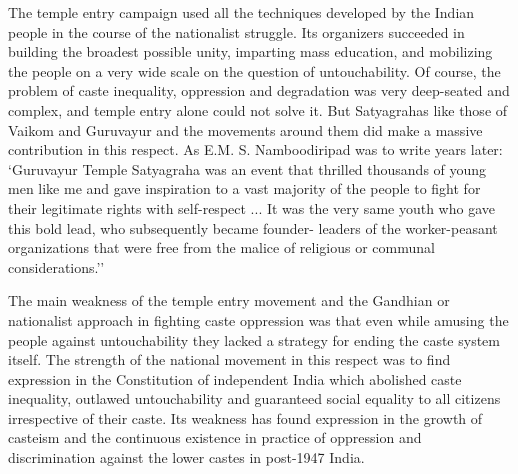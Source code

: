 The temple entry campaign used all the techniques developed by the Indian people in the course of the nationalist struggle. Its organizers succeeded in building the broadest possible unity, imparting mass education, and mobilizing the people on a very wide scale on the question of untouchability. Of course, the problem of caste inequality, oppression and degradation was very deep-seated and complex, and temple entry alone could not solve it. But Satyagrahas like those of Vaikom and Guruvayur and the movements around them did make a massive contribution in this respect. As E.M. S. Namboodiripad was to write years later: `Guruvayur Temple Satyagraha was an event that thrilled thousands of young men like me and gave inspiration to a vast majority of the people to fight for their legitimate rights with self-respect ... It was the very same youth who gave this bold lead, who subsequently became founder- leaders of the worker-peasant organizations that were free from the malice of religious or communal considerations.''

The main weakness of the temple entry movement and the Gandhian or nationalist approach in fighting caste oppression was that even while amusing the people against untouchability they lacked a strategy for ending the caste system itself. The strength of the national movement in this respect was to find expression in the Constitution of independent India which abolished caste inequality, outlawed untouchability and guaranteed social equality to all citizens irrespective of their caste. Its weakness has found expression in the growth of casteism and the continuous existence in practice of oppression and discrimination against the lower castes in post-1947 India.
